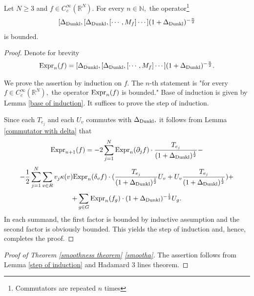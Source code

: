 \documentclass{amsart}
\begin{document}
\begin{lemma}\label{step of induction} Let $N\geq3$ and $f\in C_c^\infty(\mathbb{R}^N).$ For every $n\in\mathbb{N},$ the operator\footnote{Commutators are repeated $n$ times}
$$[\Delta_{{\rm Dunkl}},[\Delta_{{\rm Dunkl}},[\cdots,M_f]\cdots](1+\Delta_{{\rm Dunkl}})^{-\frac{n}{2}}$$
is bounded.
\end{lemma}
\begin{proof} Denote for brevity
$${\rm Expr}_n(f)=[\Delta_{{\rm Dunkl}},[\Delta_{{\rm Dunkl}},[\cdots,M_f]\cdots](1+\Delta_{{\rm Dunkl}})^{-\frac{n}{2}}.$$

We prove the assertion by induction on $f.$ The $n$-th statement is "for every $f\in C^{\infty}_c(\mathbb{R}^N),$ the operator
${\rm Expr}_n(f)$ is bounded." Base of induction is given by Lemma \ref{base of induction}. It suffices to prove the step of induction.

Since each $T_{e_j}$ and each $U_v$ commutes with $\Delta_{{\rm Dunkl}},$ it follows from Lemma \ref{commutator with delta} that
$${\rm Expr}_{n+1}(f)=-2\sum_{j=1}^N{\rm Expr}_n(\partial_jf)\cdot \frac{T_{e_j}}{(1+\Delta_{{\rm Dunkl}})^{\frac12}}-$$
$$-\frac12\sum_{j=1}^N\sum_{v\in R}v_j\kappa(v){\rm Expr}_n(\delta_vf)\cdot (\frac{T_{e_j}}{(1+\Delta_{{\rm Dunkl}})^{\frac12}}U_v+U_v\frac{T_{e_j}}{(1+\Delta_{{\rm Dunkl}})^{\frac12}})+$$
$$+\sum_{g\in G}{\rm Expr}_n(f_g)\cdot (1+\Delta_{{\rm Dunkl}})^{-\frac12}U_g.$$
In each summand, the first factor is bounded by inductive assumption and the second factor is obviously bounded. This yields the step of induction and, hence, completes the proof.
\end{proof}

\begin{proof}[Proof of Theorem \ref{smoothness theorem} \eqref{smootha}] The assertion follows from Lemma \ref{step of induction} and Hadamard 3 lines theorem.
\end{proof}
\end{document}
